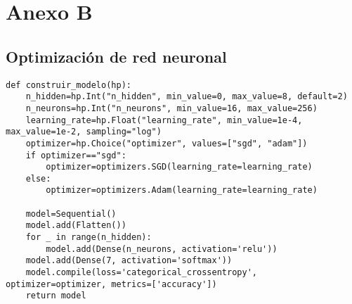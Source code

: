 \documentclass[conference]{IEEEtran}
\begin{document}
\section{Anexo B}
\subsection{Optimización de red neuronal}
\begin{lstlisting}[frame=single]
    def construir_modelo(hp):
    n_hidden=hp.Int("n_hidden", min_value=0, max_value=8, default=2)
    n_neurons=hp.Int("n_neurons", min_value=16, max_value=256)
    learning_rate=hp.Float("learning_rate", min_value=1e-4, max_value=1e-2, sampling="log")
    optimizer=hp.Choice("optimizer", values=["sgd", "adam"])
    if optimizer=="sgd":
        optimizer=optimizers.SGD(learning_rate=learning_rate)
    else:
        optimizer=optimizers.Adam(learning_rate=learning_rate)

    model=Sequential()
    model.add(Flatten())
    for _ in range(n_hidden):
        model.add(Dense(n_neurons, activation='relu'))
    model.add(Dense(7, activation='softmax'))
    model.compile(loss='categorical_crossentropy', optimizer=optimizer, metrics=['accuracy'])
    return model
\end{lstlisting}
\end{document}
